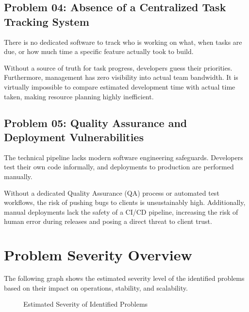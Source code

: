 \documentclass[12pt,a4paper]{report}
\begin{document}
\subsection{Problem 04: Absence of a Centralized Task Tracking System}

\begin{problemBox}
There is no dedicated software to track who is working on what, when tasks are due, or how much time a specific feature actually took to build.
\end{problemBox}

Without a source of truth for task progress, developers guess their priorities. Furthermore, management has zero visibility into actual team bandwidth. It is virtually impossible to compare estimated development time with actual time taken, making resource planning highly inefficient.

\subsection{Problem 05: Quality Assurance and Deployment Vulnerabilities}

\begin{problemBox}
The technical pipeline lacks modern software engineering safeguards. Developers test their own code informally, and deployments to production are performed manually.
\end{problemBox}

Without a dedicated Quality Assurance (QA) process or automated test workflows, the risk of pushing bugs to clients is unsustainably high. Additionally, manual deployments lack the safety of a CI/CD pipeline, increasing the risk of human error during releases and posing a direct threat to client trust.

\section{Problem Severity Overview}

The following graph shows the estimated severity level of the identified problems based on their impact on operations, stability, and scalability.

\begin{figure}[H]
\centering
{}
\caption{Estimated Severity of Identified Problems}
\end{figure}
\end{document}
